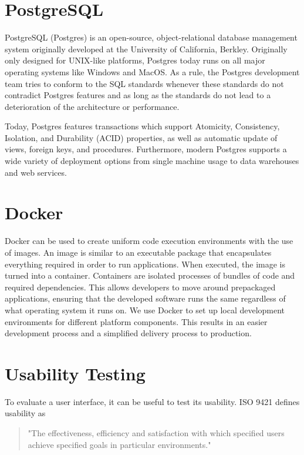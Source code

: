\section{PostgreSQL}
PostgreSQL (Postgres) is an open-source, object-relational database management system originally developed at the University of California, Berkley. Originally only designed for UNIX-like platforms, Postgres today runs on all major operating systems like Windows and MacOS\cite{Postgres_Docs}.
As a rule, the Postgres development team tries to conform to the SQL standards whenever these standards do not contradict Postgres features and as long as the standards do not lead to a deterioration of the architecture or performance\cite{Postgres_Docs}.

Today, Postgres features transactions which support Atomicity, Consistency, Isolation, and Durability (ACID) properties, as well as automatic update of views, foreign keys, and procedures.
Furthermore, modern Postgres supports a wide variety of deployment options from single machine usage to data warehouses and web services\cite{Postgres_Docs}.

\section{Docker}
Docker can be used to create uniform code execution environments with the use of images\cite{Docker_Container}.
An image is similar to an executable package that encapsulates everything required in order to run applications. 
When executed, the image is turned into a container.
Containers are isolated processes of bundles of code and required dependencies. 
This allows developers to move around prepackaged applications, ensuring that the developed software runs the same regardless of what operating system it runs on\cite{Docker_Container}.
We use Docker to set up local development environments for different platform components. This results in an easier development process and a simplified delivery process to production.

\section{Usability Testing}
To evaluate a user interface, it can be useful to test its usability. ISO 9421 defines usability as
\begin{quote}
	"The effectiveness, efficiency and satisfaction with which specified users achieve specified goals in particular environments."
\end{quote}

